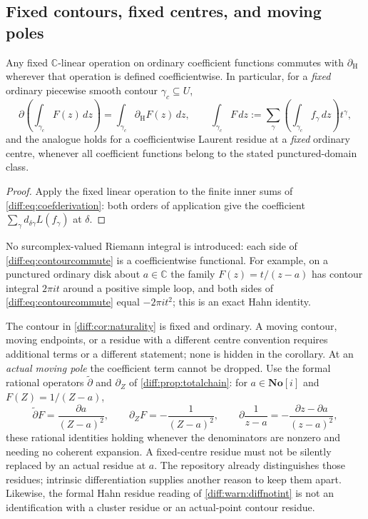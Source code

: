 \documentclass[11pt,letterpaper]{article}
\numberwithin{equation}{section}
\theoremstyle{definition}
\theoremstyle{remark}
\newcommand{\SC}{\mathbf{No}[i]}
\newcommand{\C}{\mathbb C}
\newcommand{\der}{\partial}
\newcommand{\dercoef}{\der_{\mathrm H}}
\newcommand{\dertil}{\widetilde{\der}}
\newcommand{\derZ}{\der_{Z}}
\begin{document}
\subsection{Fixed contours, fixed centres, and moving poles}
\label{diff:sub:contours}

\begin{corollary}
\label{diff:cor:naturality}
Any fixed $\C$-linear operation on ordinary coefficient functions commutes
with $\dercoef$ wherever that operation is defined coefficientwise. In
particular, for a \emph{fixed} ordinary piecewise smooth contour
$\gamma_{c}\subseteq U$,
\begin{equation}\label{diff:eq:contourcommute}
 \der\!\left(\int_{\gamma_{c}}F(z)\,dz\right)
 =\int_{\gamma_{c}}\dercoef F(z)\,dz,
 \qquad
 \int_{\gamma_{c}}F\,dz:=\sum_{\gamma}
 \left(\int_{\gamma_{c}}f_{\gamma}\,dz\right)t^{\gamma},
\end{equation}
and the analogue holds for a coefficientwise Laurent residue at a
\emph{fixed} ordinary centre, whenever all coefficient functions belong to the
stated punctured-domain class.
\end{corollary}
\begin{proof}
Apply the fixed linear operation to the finite inner sums of
\cref{diff:eq:coefderivation}: both orders of application give the coefficient
$\sum_{\gamma}d_{\delta\gamma}L(f_{\gamma})$ at $\delta$.
\end{proof}

No surcomplex-valued Riemann integral is introduced: each side of
\cref{diff:eq:contourcommute} is a coefficientwise functional. For example, on
a punctured ordinary disk about $a\in\C$ the family $F(z)=t/(z-a)$ has contour
integral $2\pi it$ around a positive simple loop, and both sides of
\cref{diff:eq:contourcommute} equal $-2\pi it^{2}$; this is an exact Hahn
identity.

\begin{warning}
\label{diff:warn:movingpole}
The contour in \cref{diff:cor:naturality} is fixed and ordinary. A moving
contour, moving endpoints, or a residue with a different centre convention
requires additional terms or a different statement; none is hidden in the
corollary. At an \emph{actual moving pole} the coefficient term cannot be
dropped. Use the formal rational operators $\dertil$ and $\derZ$ of
\cref{diff:prop:totalchain}: for $a\in\SC$ and $F(Z)=1/(Z-a)$,
\begin{equation}\label{diff:eq:movingpole}
 \dertil F=\frac{\der a}{(Z-a)^{2}},\qquad
 \derZ F=-\frac{1}{(Z-a)^{2}},\qquad
 \der\frac{1}{z-a}=-\frac{\der z-\der a}{(z-a)^{2}},
\end{equation}
these rational identities holding whenever the denominators are nonzero and
needing no coherent expansion. A fixed-centre residue must not be silently
replaced by an actual residue at $a$. The repository already distinguishes
those residues; intrinsic differentiation supplies another reason to keep them
apart. Likewise, the formal Hahn residue reading of
\cref{diff:warn:diffnotint} is not an identification with a cluster residue or
an actual-point contour residue.
\end{warning}
\end{document}
